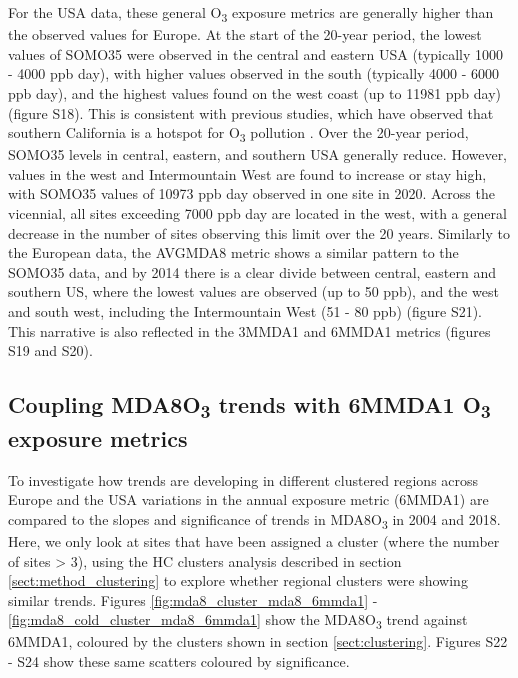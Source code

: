 \documentclass[journal abbreviation, manuscript]{copernicus}
\begin{document}
For the USA data, these general O\textsubscript{3} exposure metrics are generally higher than the observed values for Europe. At the start of the 20-year period, the lowest values of SOMO35 were observed in the central and eastern USA (typically 1000 - 4000 ppb day), with higher values observed in the south (typically 4000 - 6000 ppb day), and the highest values found on the west coast (up to 11981 ppb day) (figure S18). This is consistent with previous studies, which have observed that southern California is a hotspot for O\textsubscript{3} pollution \citep{fleming_2018, WangKeding2024}. Over the 20-year period, SOMO35 levels in central, eastern, and southern USA generally reduce. However, values in the west and Intermountain West are found to increase or stay high, with SOMO35 values of 10973 ppb day observed in one site in 2020. Across the vicennial, all sites exceeding 7000 ppb day are located in the west, with a general decrease in the number of sites observing this limit over the 20 years. Similarly to the European data, the AVGMDA8 metric shows a similar pattern to the SOMO35 data, and by 2014 there is a clear divide between central, eastern and southern US, where the lowest values are observed (up to 50 ppb), and the west and south west, including the Intermountain West (51 - 80 ppb) (figure S21). This narrative is also reflected in the 3MMDA1 and 6MMDA1 metrics (figures S19 and S20).

\subsection{Coupling MDA8O\textsubscript{3} trends with 6MMDA1 O\textsubscript{3} exposure metrics} \label{sect:polluted_stuff}

To investigate how trends are developing in different clustered regions across Europe and the USA variations in the annual exposure metric (6MMDA1) are compared to the slopes and significance of trends in MDA8O\textsubscript{3} in 2004 and 2018. Here, we only look at sites that have been assigned a cluster (where the number of sites > 3), using the HC clusters analysis described in section \ref{sect:method_clustering} to explore whether regional clusters were showing similar trends. Figures \ref{fig:mda8_cluster_mda8_6mmda1} - \ref{fig:mda8_cold_cluster_mda8_6mmda1} show the MDA8O\textsubscript{3} trend against 6MMDA1, coloured by the clusters shown in section \ref{sect:clustering}. Figures S22 - S24 show these same scatters coloured by significance.
\end{document}
